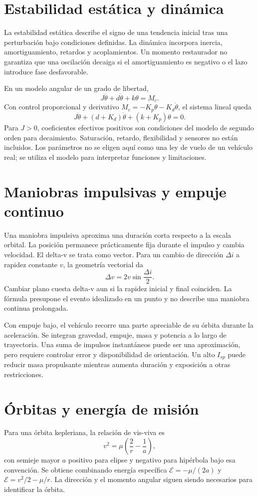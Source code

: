 \section{Estabilidad estática y dinámica}
La estabilidad estática describe el signo de una tendencia inicial tras una perturbación bajo condiciones definidas. La dinámica incorpora inercia, amortiguamiento, retardos y acoplamientos. Un momento restaurador no garantiza que una oscilación decaiga si el amortiguamiento es negativo o el lazo introduce fase desfavorable.

En un modelo angular de un grado de libertad,
\[
 J\ddot\theta+d\dot\theta+k\theta=M_c.
\]
Con control proporcional y derivativo $M_c=-K_p\theta-K_d\dot\theta$, el sistema lineal queda
\[
 J\ddot\theta+(d+K_d)\dot\theta+(k+K_p)\theta=0.
\]
Para $J>0$, coeficientes efectivos positivos son condiciones del modelo de segundo orden para decaimiento. Saturación, retardo, flexibilidad y sensores no están incluidos. Los parámetros no se eligen aquí como una ley de vuelo de un vehículo real; se utiliza el modelo para interpretar funciones y limitaciones.
\section{Maniobras impulsivas y empuje continuo}
Una maniobra impulsiva aproxima una duración corta respecto a la escala orbital. La posición permanece prácticamente fija durante el impulso y cambia velocidad. El delta-v se trata como vector. Para un cambio de dirección $\Delta i$ a rapidez constante $v$, la geometría vectorial da
\[
 \Delta v=2v\sin\frac{\Delta i}{2}.
\]
Cambiar plano cuesta delta-v aun si la rapidez inicial y final coinciden. La fórmula presupone el evento idealizado en un punto y no describe una maniobra continua prolongada.

Con empuje bajo, el vehículo recorre una parte apreciable de su órbita durante la aceleración. Se integran gravedad, empuje, masa y potencia a lo largo de trayectoria. Una suma de impulsos instantáneos puede ser una aproximación, pero requiere controlar error y disponibilidad de orientación. Un alto $I_{sp}$ puede reducir masa propulsante mientras aumenta duración y exposición a otras restricciones.\cite{MIT35,JPL-EP}
\section{Órbitas y energía de misión}
Para una órbita kepleriana, la relación de vis-viva es
\[
 v^2=\mu\left(\frac2r-\frac1a\right),
\]
con semieje mayor $a$ positivo para elipse y negativo para hipérbola bajo esa convención. Se obtiene combinando energía específica $\mathcal E=-\mu/(2a)$ y $\mathcal E=v^2/2-\mu/r$. La dirección y el momento angular siguen siendo necesarios para identificar la órbita.

